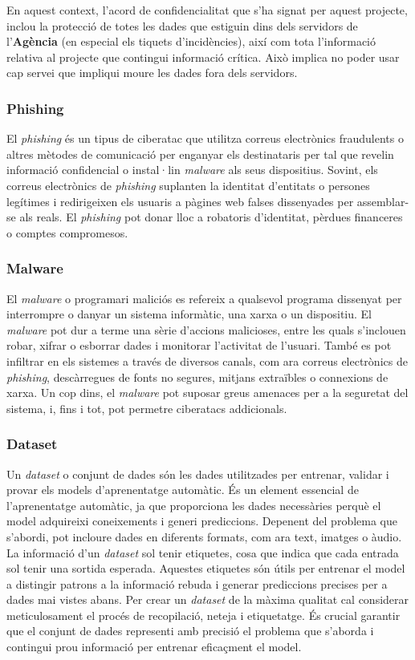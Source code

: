 En aquest context, l'acord de confidencialitat que s'ha signat per aquest projecte, inclou la protecció de totes les dades que estiguin dins dels servidors de l'\textbf{Agència} (en especial els tiquets d'incidències), així com tota l'informació relativa al projecte que contingui informació crítica. Això implica no poder usar cap servei que impliqui moure les dades fora dels servidors.

\subsubsection{Phishing}
El \textit{phishing} és un tipus de ciberatac que utilitza correus electrònics fraudulents o altres mètodes de comunicació per enganyar els destinataris per tal que revelin informació confidencial o instal·lin \textit{malware} als seus dispositius. Sovint, els correus electrònics de \textit{phishing} suplanten la identitat d'entitats o persones legítimes i redirigeixen els usuaris a pàgines web falses dissenyades per assemblar-se als reals. El \textit{phishing} pot donar lloc a robatoris d'identitat, pèrdues financeres o comptes compromesos.

\subsubsection{Malware}
El \textit{malware} o programari maliciós es refereix a qualsevol programa dissenyat per interrompre o danyar un sistema informàtic, una xarxa o un dispositiu. El \textit{malware} pot dur a terme una sèrie d'accions malicioses, entre les quals s'inclouen robar, xifrar o esborrar dades i monitorar l'activitat de l'usuari. També es pot infiltrar en els sistemes a través de diversos canals, com ara correus electrònics de \textit{phishing}, descàrregues de fonts no segures, mitjans extraïbles o connexions de xarxa. Un cop dins, el \textit{malware} pot suposar greus amenaces per a la seguretat del sistema, i, fins i tot, pot permetre ciberatacs addicionals.

\subsubsection{Dataset}
Un \textit{dataset} o conjunt de dades són les dades utilitzades per entrenar, validar i provar els models d'aprenentatge automàtic. És un element essencial de l'aprenentatge automàtic, ja que proporciona les dades necessàries perquè el model adquireixi coneixements i generi prediccions. Depenent del problema que s'abordi, pot incloure dades en diferents formats, com ara text, imatges o àudio. La informació d'un \textit{dataset} sol tenir etiquetes, cosa que indica que cada entrada sol tenir una sortida esperada. Aquestes etiquetes són útils per entrenar el model a distingir patrons a la informació rebuda i generar prediccions precises per a dades mai vistes abans. Per crear un \textit{dataset} de la màxima qualitat cal considerar meticulosament el procés de recopilació, neteja i etiquetatge. És crucial garantir que el conjunt de dades representi amb precisió el problema que s'aborda i contingui prou informació per entrenar eficaçment el model.
